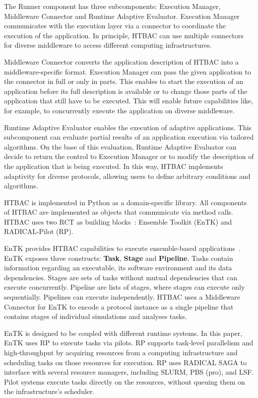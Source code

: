 The Runner component has three subcomponents: Execution Manager, Middleware
Connector and Runtime Adaptive Evaluator. Execution Manager communicates with
the execution layer via a connector to coordinate the execution of the
application. In principle, HTBAC can use multiple connectors for diverse
middleware to access different computing infrastructures.

Middleware Connector converts the application description of HTBAC into a
middleware-specific format. Execution Manager can pass the given application
to the connector in full or only in parts. This enables to start the
execution of an application before its full description is available or to
change those parts of the application that still have to be executed. This
will enable future capabilities like, for example, to concurrently execute
the application on diverse middleware.

Runtime Adaptive Evaluator enables the execution of adaptive applications.
This subcomponent can evaluate partial results of an application execution
via tailored algorithms. On the base of this evaluation, Runtime Adaptive
Evaluator can decide to return the control to Execution Manager or to modify
the description of the application that is being executed. In this way, HTBAC
implements adaptivity for diverse protocols, allowing users to define
arbitrary conditions and algorithms.

HTBAC is implemented in Python as a domain-specific library. All components
of HTBAC are implemented as objects that communicate via method calls. HTBAC
uses two RCT as building blocks~\cite{review_bb_2016}: Ensemble Toolkit
(EnTK) and RADICAL-Pilot (RP).

EnTK provides HTBAC capabilities to execute ensemble-based
applications~\cite{power-of-many17}. EnTK exposes three constructs:
\textbf{Task}, \textbf{Stage} and \textbf{Pipeline}. Tasks contain
information regarding an executable, its software environment and its data
dependencies. Stages are sets of tasks without mutual dependencies that can
execute concurrently. Pipeline are lists of stages, where stages can execute
only sequentially. Pipelines can execute independently. HTBAC uses a
Middleware Connector for EnTK to encode a protocol instance as a single
pipeline that contains stages of individual simulations and analyses tasks.

EnTK is designed to be coupled with different runtime systems. In this paper,
EnTK uses RP to execute tasks via pilots. RP supports task-level parallelism
and high-throughput by acquiring resources from a computing infrastructure
and scheduling tasks on those resources for execution. RP uses RADICAL SAGA
to interface with several resource managers, including SLURM, PBS (pro), and
LSF. Pilot systems execute tasks directly on the resources, without queuing
them on the infrastructure's scheduler.

